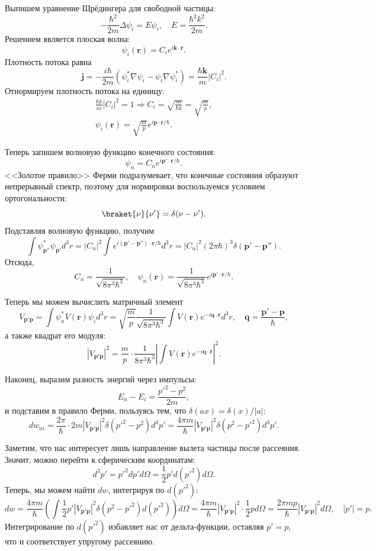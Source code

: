 Выпишем уравнение Шрёдингера для свободной частицы:
\[
  -\frac{\hbar^2}{2m}\Delta\psi_i = E\psi_i, \quad E = \frac{\hbar^2 k^2}{2m}.
\]
Решением является плоская волна:
\[
  \psi_i(\textbf{r}) = C_i e^{i \textbf{k}\cdot \textbf{r}}.
\]
Плотность потока равна
\[
  \textbf{j} = -\frac{i\hbar}{2m}(\psi_i^{*}\nabla\psi_i -
  \psi_i \nabla\psi_i^{*}) = \frac{\hbar\textbf{k}}{m}|C_i|^2.
\]
Отнормируем плотность потока на единицу:
\begin{gather*}
  \frac{\hbar k}{m}|C_i|^2 = 1 \Longrightarrow C_i =
  \sqrt{\frac{m}{\hbar k}} = \sqrt{\frac{m}{p}}, \\
  \psi_i(\textbf{r}) = \sqrt{\frac{m}{p}}e^{i\textbf{p}\cdot\textbf{r}/\hbar}.
\end{gather*}

Теперь запишем волновую функцию конечного состояния:
\[
  \psi_n = C_n e^{i\textbf{p}'\cdot \textbf{r}/\hbar}.
\]
<<Золотое правило>> Ферми подразумевает, что конечные состояния образуют
непрерывный спектр, поэтому для нормировки воспользуемся условием
ортогональности:
\[
  \braket{\nu}{\nu'} = \delta(\nu-\nu').
\]
Подставляя волновую функцию, получим
\[
  \int \psi^{*}_{\textbf{p}''}\psi_{\textbf{p}'} d^3 r =
  |C_n|^2\int e^{i(\textbf{p}' - \textbf{p}'')\cdot\textbf{r}/\hbar}d^3 r =
  |C_n|^2 (2\pi\hbar)^3\delta(\textbf{p}' - \textbf{p}'').
\]
Отсюда,
\[
  C_n = \frac{1}{\sqrt{8\pi^3\hbar^3}}, \quad \psi_n(\textbf{r}) =
  \frac{1}{\sqrt{8\pi^3\hbar^3}}e^{i\textbf{p}'\cdot\textbf{r}/\hbar}.
\]

Теперь мы можем вычислить матричный элемент
\[
  V_{\textbf{p}'\textbf{p}} = \int\psi_n^{*}V(\textbf{r})\psi_i d^3 r =
  \sqrt{\frac{m}{p}}\frac{1}{\sqrt{8\pi^3\hbar^3}}\int V(\textbf{r})
  e^{-i\textbf{q}\cdot\textbf{r}}d^3 r,\quad \textbf{q} =
  \frac{\textbf{p}'-\textbf{p}}{\hbar},
\]
а также квадрат его модуля:
\[
  |V_{\textbf{p}'\textbf{p}}|^2 =
  \frac{m}{p}\cdot\frac{1}{8\pi^3\hbar^3}\left|\int
  V(\mathbf{r})e^{-i\mathbf{q}\cdot\mathbf{r}}\right|^2.
\]

Наконец, выразим разность энергий через импульсы:
\[
  E_n-E_i = \frac{p'^2-p^2}{2m},
\]
и подставим в правило Ферми, пользуясь тем, что $\delta(ax) = \delta(x)/|a|$:
\[
  dw_{ni} = \frac{2\pi}{\hbar}\cdot2m|V_{\mathbf{p'p}}|^2\delta(p'^2-p^2)d^3p'
  = \frac{4\pi m}{\hbar}|V_{\mathbf{p'p}}|^2\delta(p^2-p'^2)d^3p'.
\]

Заметим, что нас интересует лишь направление вылета частицы после рассеяния.
Значит, можно перейти к сферическим координатам:
\[
  d^3p' = p'^2dp'd\Omega = \frac{1}{2}p'd(p'^2)d\Omega.
\]
Теперь, мы можем найти $dw$, интегрируя по $d(p'^2)$:
\[
  dw = \frac{4\pi m}{\hbar}
  \left(\int\frac{1}{2}p'|V_{\mathbf{p'p}}|^2\delta(p^2-p'^2)d(p'^2)\right)d\Omega =
  \frac{4\pi m}{\hbar}|V_{\mathbf{p'p}}|^2\cdot\frac{1}{2}p d\Omega =
  \frac{2\pi m p}{\hbar}|V_{\mathbf{p'p}}|^2d\Omega, \quad |p'| = p.
\]
Интегрирование по $d(p'^2)$ избавляет нас от дельта-функции, оставляя $p'=p$,
что и соответствует упругому рассеянию.

